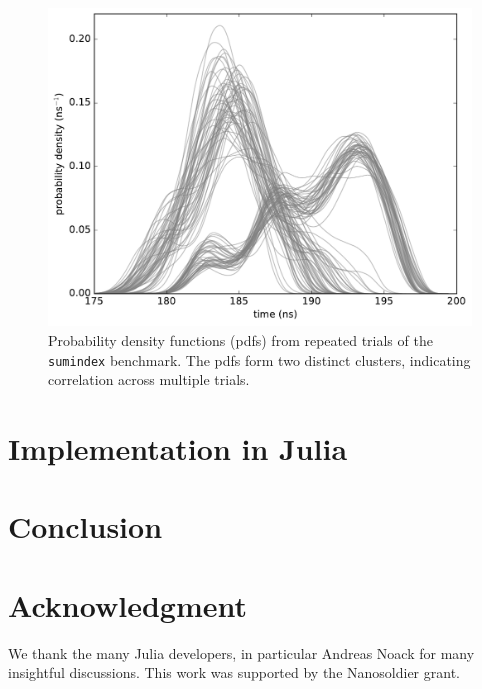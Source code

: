\documentclass[conference]{IEEEtran}
\begin{document}
\begin{figure}[!t]
\centering
\includegraphics[width=\columnwidth]{figures/fig4/kde_pdf_sumindex}
\caption{Probability density functions (pdfs) from repeated trials of the
\lstinline|sumindex| benchmark. The pdfs form two distinct clusters, indicating
correlation across multiple trials.}
\label{fig:pdfsumindex}
\end{figure}

\label{sec:julia}
\section{Implementation in Julia}

\label{sec:conclusion}
\section{Conclusion}

\label{sec:acknowledgement}
\section*{Acknowledgment}

We thank the many Julia developers, in particular Andreas Noack for many insightful
discussions. This work was supported by the Nanosoldier grant.




\end{document}
